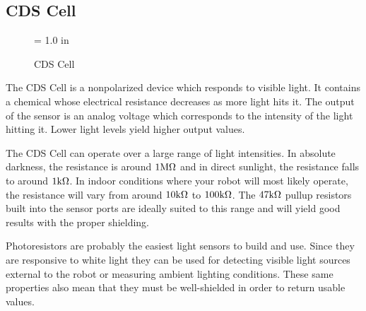 \subsection{CDS Cell}

\begin{figure}[htbp]
\begin{center}
\epsfysize = 1.0 in
 \caption{CDS Cell}
 \label{cds}
\end{center}
\end{figure}

The CDS Cell is a nonpolarized device which responds to visible light. It contains a chemical whose electrical resistance decreases as more light hits it. The output of the sensor is an analog voltage which corresponds to the intensity of the light hitting it. Lower light levels yield higher output values.

The CDS Cell can operate over a large range of light intensities. In
absolute darkness, the resistance is around $1{\rm M}\Omega$ and in
direct sunlight, the resistance falls to around $1{\rm k}\Omega$. In indoor
conditions where your robot will most likely operate, the resistance
will vary from around $10{\rm k}\Omega$ to $100{\rm k}\Omega$. The $47{\rm k}\Omega$ pullup
resistors built into the sensor ports are ideally suited to this range
and will yield good results with the proper shielding.

Photoresistors are probably the easiest light sensors to build and use. Since they are responsive to white light they can be used for detecting visible light sources external to the robot or measuring ambient lighting conditions. These same properties also mean that they must be well-shielded in order to return usable values.
